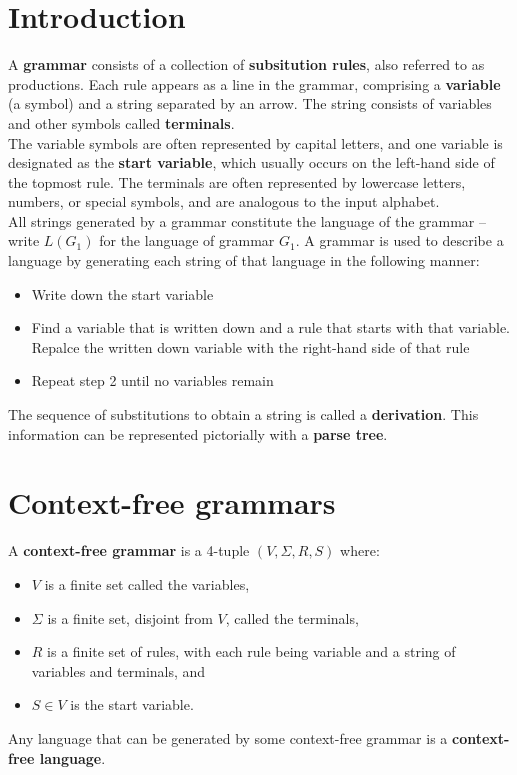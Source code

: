 \documentclass{article}
\begin{document}
\section{Introduction}
\noindent A \textbf{grammar} consists of a collection of \textbf{subsitution rules}, also referred to as productions. Each rule appears as a line in the grammar, comprising a \textbf{variable} (a symbol) and a string separated by an arrow. The string consists of variables and other symbols called \textbf{terminals}.\medskip
\\ The variable symbols are often represented by capital letters, and one variable is designated as the \textbf{start variable}, which usually occurs on the left-hand side of the topmost rule. The terminals are often represented by lowercase letters, numbers, or special symbols, and are analogous to the input alphabet.\medskip
\\ All strings generated by a grammar constitute the language of the grammar -- write $L(G_1)$ for the language of grammar $G_1$. A grammar is used to describe a language by generating each string of that language in the following manner:
\begin{itemize}
	\item Write down the start variable
	\item Find a variable that is written down and a rule that starts with that variable. Repalce the written down variable with the right-hand side of that rule
	\item Repeat step 2 until no variables remain
\end{itemize}
The sequence of substitutions to obtain a string is called a \textbf{derivation}. This information can be represented pictorially with a \textbf{parse tree}.

\section{Context-free grammars}
A \textbf{context-free grammar} is a 4-tuple $(V, \Sigma, R, S)$ where:
\begin{itemize}
	\item $V$ is a finite set called the variables,
	\item $\Sigma$ is a finite set, disjoint from $V$, called the terminals,
	\item $R$ is a finite set of rules, with each rule being  variable and a string of variables and terminals, and
	\item $S \in V$ is the start variable.
\end{itemize}
Any language that can be generated by some context-free grammar is a \textbf{context-free language}.
\end{document}
